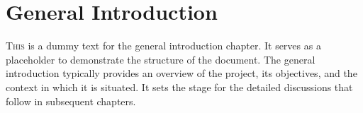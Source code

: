 \pagestyle{mainmatter}
\chapter*{General Introduction}
\noindent \lettrine[lines=2]{T}{his} is a dummy text for the general introduction chapter. It serves as a placeholder to demonstrate the structure of the document. The general introduction typically provides an overview of the project, its objectives, and the context in which it is situated. It sets the stage for the detailed discussions that follow in subsequent chapters.

\lipsum[1-3]
